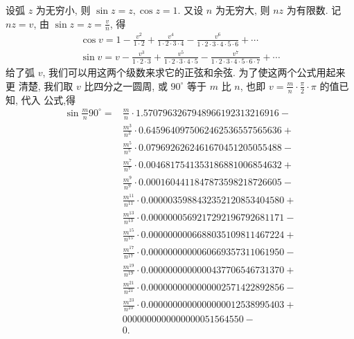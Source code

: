 设弧 $z$ 为无穷小, 则 $\sin z=z, \cos z=1$. 又设 $n$ 为无穷大, 则 $n z$ 为有限数. 记 $n z=v$, 由 $\sin z=z=\frac{v}{n}$, 得
\[
\begin{gathered}
\cos v=1-\frac{v^{2}}{1 \cdot 2}+\frac{v^{4}}{1 \cdot 2 \cdot 3 \cdot 4}-\frac{v^{6}}{1 \cdot 2 \cdot 3 \cdot 4 \cdot 5 \cdot 6}+\cdots \\
\sin v=v-\frac{v^{3}}{1 \cdot 2 \cdot 3}+\frac{v^{5}}{1 \cdot 2 \cdot 3 \cdot 4 \cdot 5}-\frac{v^{7}}{1 \cdot 2 \cdot 3 \cdot 4 \cdot 5 \cdot 6 \cdot 7}+\cdots
\end{gathered}
\]
给了弧 $v$, 我们可以用这两个级数来求它的正弦和余弦. 为了使这两个公式用起来更 清楚, 我们取 $v$ 比四分之一圆周, 或 $90^{\circ}$ 等于 $m$ 比 $n$, 也即 $v=\frac{m}{n} \cdot \frac{\pi}{2} \cdot \pi$ 的值已知, 代入 公式,得
\[
\begin{aligned}
\sin \frac{m}{n} 90^{\circ}= & \frac{m}{n} \cdot 1.5707963267948966192313216916- \\
& \frac{m^{3}}{n^{3}} \cdot 0.6459640975062462536557565636+ \\
& \frac{m^{5}}{n^{5}} \cdot 0.0796926262461670451205055488- \\
& \frac{m^{7}}{n^{7}} \cdot 0.0046817541353186881006854632+ \\
& \frac{m^{9}}{n^{9}} \cdot 0.0001604411847873598218726605- \\
& \frac{m^{11}}{n^{11}} \cdot 0.0000035988432352120853404580+ \\
& \frac{m^{13}}{n^{13}} \cdot 0.0000000569217292196792681171- \\
& \frac{m^{15}}{n^{15}} \cdot 0.0000000006688035109811467224+ \\
& \frac{m^{17}}{n^{17}} \cdot 0.0000000000060669357311061950- \\
& \frac{m^{19}}{n^{19}} \cdot 0.0000000000000437706546731370+ \\
& \frac{m^{21}}{n^{21}} \cdot 0.0000000000000002571422892856- \\
& \frac{m^{23}}{n^{23}} \cdot 0.0000000000000000012538995403+ \\
& 0000000000000000051564550- \\
& 0 .
\end{aligned}
\]
